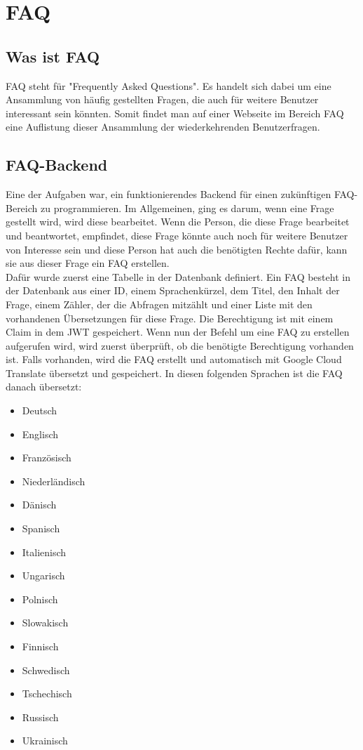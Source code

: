 \chapter{FAQ}
\section{Was ist FAQ}
FAQ steht für "Frequently Asked Questions". Es handelt sich dabei um eine Ansammlung von häufig gestellten Fragen, die auch für weitere Benutzer interessant sein könnten. Somit findet man auf einer Webseite im Bereich FAQ eine Auflistung dieser Ansammlung der wiederkehrenden Benutzerfragen.
\section{FAQ-Backend}
Eine der Aufgaben war, ein funktionierendes Backend für einen zukünftigen FAQ-Bereich zu programmieren. Im Allgemeinen, ging es darum, wenn eine Frage gestellt wird, wird diese bearbeitet. Wenn die Person, die diese Frage bearbeitet und beantwortet, empfindet, diese Frage könnte auch noch für weitere Benutzer von Interesse sein und diese Person hat auch die benötigten Rechte dafür, kann sie aus dieser Frage ein FAQ erstellen.\\
Dafür wurde zuerst eine Tabelle in der Datenbank definiert. Ein FAQ besteht in der Datenbank aus einer ID, einem Sprachenkürzel, dem Titel, den Inhalt der Frage, einem Zähler, der die Abfragen mitzählt und einer Liste mit den vorhandenen Übersetzungen für diese Frage. Die Berechtigung ist mit einem Claim in dem JWT gespeichert. Wenn nun der Befehl um eine FAQ zu erstellen aufgerufen wird, wird zuerst überprüft, ob die benötigte Berechtigung vorhanden ist. Falls vorhanden, wird die FAQ erstellt und automatisch mit Google Cloud Translate übersetzt und gespeichert. In diesen folgenden Sprachen ist die FAQ danach übersetzt:
\begin{multicols}{2}
	\begin{itemize}
		\item Deutsch
		\item Englisch
		\item Französisch
		\item Niederländisch
		\item Dänisch
		\item Spanisch
		\item Italienisch
		\item Ungarisch
		\item Polnisch
		\item Slowakisch
		\item Finnisch
		\item Schwedisch
		\item Tschechisch
		\item Russisch
		\item Ukrainisch
	\end{itemize}
\end{multicols}
